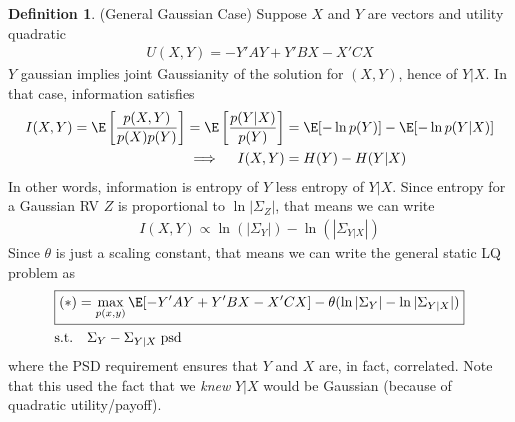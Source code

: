 \documentclass[12pt]{article}
\theoremstyle{plain}
\theoremstyle{definition}
\newtheorem{defn}[thm]{Definition}
\theoremstyle{remark}
\begin{document}
\begin{defn}(General Gaussian Case)
Suppose $X$ and $Y$ are vectors and utility quadratic
\begin{align*}
  U(X,Y)
  = -Y'AY + Y'BX - X'CX
\end{align*}
$Y$ gaussian implies joint Gaussianity of the solution for $(X,Y)$,
hence of $Y|X$.
In that case, information satisfies
\begin{align*}
  I(X,Y)
  =
  \E\left[
    \frac{p(X,Y)}{p(X)p(Y)}
  \right]
  =
  \E\left[
    \frac{p(Y|X)}{p(Y)}
  \right]
  &=
  \E[-\ln p(Y)]
  -\E[-\ln p(Y|X)]
  \\
  \implies\quad
  I(X,Y)
  &=
  H(Y)
  - H(Y|X)
\end{align*}
In other words, information is entropy of $Y$ less entropy of $Y|X$.
Since entropy for a Gaussian RV $Z$ is proportional to $\ln|\Sigma_Z|$,
that means we can write
\begin{align*}
  I(X,Y)
  \propto
  \ln(|\Sigma_Y|)
  - \ln(|\Sigma_{Y|X}|)
\end{align*}
Since $\theta$ is just a scaling constant, that means we can write the
general static LQ problem as
\begin{align*}
  &\boxed{%
    (*)
    =
    \max_{p(x,y)}
    \E[-Y'AY + Y'BX - X'CX]
    -\theta(\ln |\Sigma_Y|-\ln|\Sigma_{Y|X}|)
  }
  \\
  &\text{s.t.}\quad
  \Sigma_Y-\Sigma_{Y|X} \;\text{psd}
\end{align*}
where the PSD requirement ensures that $Y$ and $X$ are, in fact,
correlated.
Note that this used the fact that we \emph{knew} $Y|X$ would be Gaussian
(because of quadratic utility/payoff).
\end{defn}
\end{document}
